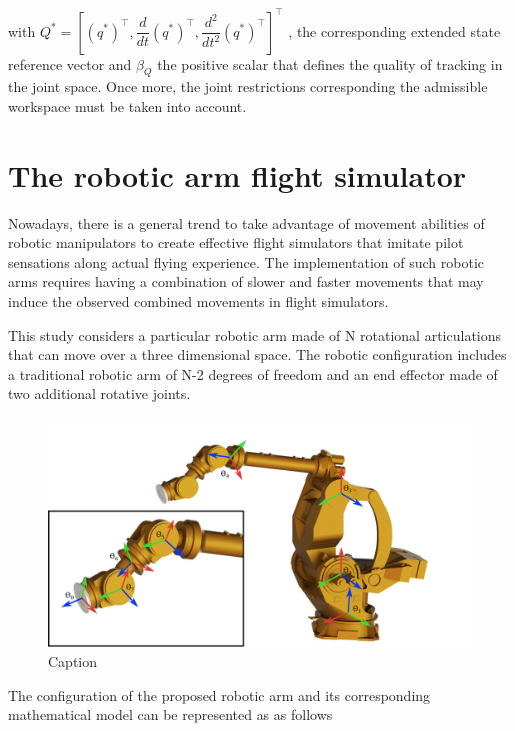 \documentclass[journal,twocolumn]{IEEEtran}
\begin{document}
\noindent with $Q^{*} = \left[ (q^{*})^{\top},\dfrac{d }{d t} (q^{*})^{\top}, \dfrac{d^{2} }{d t^{2}} (q^{*})^{\top} \right]^{\top}$ , the corresponding extended state reference vector and $\beta_{Q}$ the positive scalar that defines the quality of tracking in the joint space. Once more, the joint restrictions corresponding the admissible workspace must be taken into account. 



\section{The robotic arm flight simulator}

Nowadays, there is a general trend to take advantage of movement abilities of robotic manipulators to create effective flight simulators that imitate pilot sensations along actual flying experience. The implementation of such robotic arms requires having a combination of slower and faster movements that may induce the observed combined movements in flight simulators. 


This study considers a particular robotic arm made of N rotational articulations that can move over a three dimensional space. The robotic configuration includes a traditional robotic arm of N-2 degrees of freedom and an end effector made of two additional rotative joints.

\begin{figure}
    \centering
    \includegraphics[scale=0.6]{Figures/RoboticArm.eps}
    \caption{Caption}
    \label{fig:RoboticArmConf}
\end{figure}



The configuration of the proposed robotic arm and its corresponding mathematical model can be represented as as follows 
\end{document}
